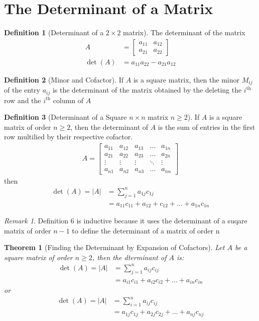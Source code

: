 \documentclass{jhwhw}
\newtheorem{theorem}{Theorem}
\theoremstyle{definition}
\newtheorem{definition}{Definition}
\theoremstyle{remark}
\newtheorem*{remark}{Remark}
\theoremstyle{example}
\begin{document}
\section{The Determinant of a Matrix}
\begin{definition}[Determinant of a \(2 \times 2\) matrix] The determinant of the matrix \begin{align*} A &= \begin{bmatrix} a_{11} & a_{12} \\ a_{21} & a_{22} \end{bmatrix} \\ \det(A) &= a_{11} a_{22} - a_{21} a_{12} \end{align*}  \end{definition}
\begin{definition}[Minor and Cofactor] If \(A\) is a square matrix, then the minor \(M_{ij}\) of the entry \(a_{ij}\) is the determinant of the matrix obtained by the deleting the \(i^{\text{th}}\) row and the \(i^{\text{th}}\) column of \(A\) \end{definition}
\begin{definition}[Determinant of a Square \(n \times n\) matrix \(n \geq 2\)] If \(A\) is a square matrix of order \(n \geq 2\), then the determinant of \(A\) is the sum of entries in the first row multilied by their respective cofactor.
\begin{align*} A = \begin{bmatrix} a_{11} & a_{12} & a_{13} & \ldots & a_{1n} \\ a_{21} & a_{22} & a_{23} & \ldots & a_{2n} \\ \vdots & \vdots & \vdots & \ddots & \vdots \\ a_{n1} & a_{n2} & a_{n3} & \ldots & a_{nn} \end{bmatrix} \end{align*} then
\begin{align*} \det(A) = |A| &= \sum_{j=1}^{n} a_{1j} c_{1j}\\
&= a_{11} c_{11} + a_{12} + c_{12} + \ldots + a_{1n} c_{1n}  \end{align*}  \end{definition}
\begin{remark} Definition 6 is inductive because it uses the determinant of a suqare matrix of order \(n-1\) to define the determinant of a matrix of order n \end{remark}
\begin{theorem}[Finding the Determinant by Expansion of Cofactors] Let \(A\) be a square matrix of order \(n \geq 2\), then the dterminant of \(A\) is:
\begin{align*} \det (A) = |A| &= \sum_{j=1}^{n} a_{ij} c_{ij}\\
&= a_{i1} c_{i1} + a_{i2} c_{i2} + \ldots + a_{in} c_{in}\end{align*} or
\begin{align*} \det (A) = |A| &= \sum_{i=1}^{n} a_{ij} c_{ij}\\
    &= a_{1j} c_{1j} + a_{2j} c_{2j} + \ldots + a_{nj} c_{nj} \end{align*}\end{theorem}
\end{document}
